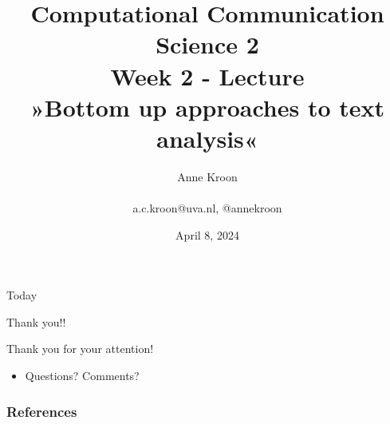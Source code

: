 \documentclass[handout]{beamer}
\title[Computational Communication Science 2]{\textbf{Computational Communication Science 2} \\Week 2 - Lecture\\ »Bottom up approaches to text analysis«}
\author[Anne Kroon]{Anne Kroon \\ ~ \\ \footnotesize{ a.c.kroon@uva.nl, @annekroon} \\}
\date{April 8, 2024}
\institute[Digital Society Minor, University of Amsterdam]{Digital Society Minor, University of Amsterdam}
\begin{document}
	
	\begin{frame}{}
		\titlepage
	\end{frame}
	
	\begin{frame}{Today}
		\begin{tiny}
		\tableofcontents
		\end{tiny}
	\end{frame}





\begin{frame}{Thank you!!}
	\begin{block}{Thank you for your attention!}
		\begin{itemize}
			\item Questions? Comments?
		\end{itemize}
	\end{block}
\end{frame}


\begin{frame}
	\frametitle{References}
	\printbibliography
\end{frame}
	
\end{document}
